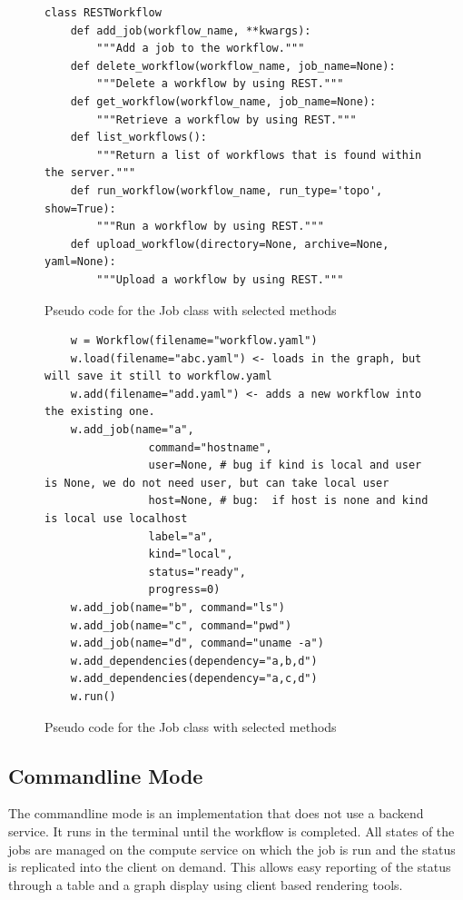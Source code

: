 \begin{figure}[htb]
\caption{Pseudo code for the Job class with selected methods}
\label{fig:code-workflow-rest}
\begin{verbatim}
class RESTWorkflow
    def add_job(workflow_name, **kwargs):
        """Add a job to the workflow."""
    def delete_workflow(workflow_name, job_name=None):
        """Delete a workflow by using REST."""
    def get_workflow(workflow_name, job_name=None):
        """Retrieve a workflow by using REST."""
    def list_workflows():
        """Return a list of workflows that is found within the server."""
    def run_workflow(workflow_name, run_type='topo', show=True):
        """Run a workflow by using REST."""
    def upload_workflow(directory=None, archive=None, yaml=None):
        """Upload a workflow by using REST."""
\end{verbatim}
\end{figure}

\begin{figure}[htb]
\caption{Pseudo code for the Job class with selected methods}
\label{fig:code-workflow-example}
\begin{verbatim}
    w = Workflow(filename="workflow.yaml")
    w.load(filename="abc.yaml") <- loads in the graph, but will save it still to workflow.yaml
    w.add(filename="add.yaml") <- adds a new workflow into the existing one.
    w.add_job(name="a",
                command="hostname",
                user=None, # bug if kind is local and user is None, we do not need user, but can take local user
                host=None, # bug:  if host is none and kind is local use localhost
                label="a",
                kind="local",
                status="ready",
                progress=0)
    w.add_job(name="b", command="ls")
    w.add_job(name="c", command="pwd")
    w.add_job(name="d", command="uname -a")
    w.add_dependencies(dependency="a,b,d")
    w.add_dependencies(dependency="a,c,d")
    w.run()
\end{verbatim}
\end{figure}

\subsection{Commandline Mode}

The commandline mode is an implementation that does not use a
backend service. It runs in the terminal until the workflow is
completed. All states of the jobs are managed on the compute service on
which the job is run and the status is replicated into the client on
demand. This allows easy reporting of the status through a table and a
graph display using client based rendering tools. 


